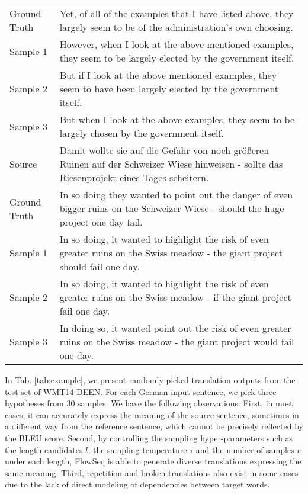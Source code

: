 \documentclass[11pt,a4paper]{article}
\begin{document}
\begin{table*}[ht!]
\begin{tabular}{p{2.5cm}p{12cm}}
\textcolor{mypink}{Ground Truth} & \textcolor{mypink}{Yet, of all of the examples that I have listed above, they largely seem to be of the administration's own choosing.}
\\
Sample 1 & However, when I look at the above mentioned examples, they seem to be largely elected by the government itself. \\
Sample 2 &  But if I look at the above mentioned examples, they seem to have been largely elected by the government itself.\\
Sample 3 &  But when I look at the above examples, they seem to be largely chosen by the government itself. \\
\midrule
\textcolor{myblue}{Source} & \textcolor{myblue}{Damit wollte sie auf die Gefahr von noch gr\"{o}ßeren Ruinen auf der Schweizer Wiese hinweisen - sollte das Riesenprojekt eines Tages scheitern.} \\
\textcolor{mypink}{Ground Truth} & \textcolor{mypink}{In so doing they wanted to point out the danger of even bigger ruins on the Schweizer Wiese - should the huge project one day fail.} \\
Sample 1 &  In so doing, it wanted to highlight the risk of even greater ruins on the Swiss meadow - the giant project should fail one day. \\
Sample 2 & In so doing, it wanted to highlight the risk of even greater ruins on the Swiss meadow - if the giant project fail one day. \\
Sample 3 &  In doing so, it wanted point out the risk of even greater ruins on the Swiss meadow - the giant project would fail one day. \\
\bottomrule
\end{tabular}
\caption{Examples of translation outputs from FlowSeq-base with sampling hyperparameters $l=3, r=10, \tau=0.4$ on WMT14-DEEN.}
\label{tab:example}
    \vspace{-2mm}
\end{table*}
In Tab. \ref{tab:example}, we present randomly picked translation outputs from the test set of WMT14-DEEN. For each German input sentence, we pick three hypotheses from 30 samples. We have the following observations: First, in most cases, it can accurately express the meaning of the source sentence, sometimes in a different way from the reference sentence, which cannot be precisely reflected by the BLEU score.
Second, by controlling the sampling hyper-parameters such as the length candidates $l$, the sampling temperature $\tau$ and the number of samples $r$ under each length, FlowSeq is able to generate diverse translations expressing the same meaning.
Third, repetition and broken translations also exist in some cases due to the lack of direct modeling of dependencies between target words.
\end{document}
